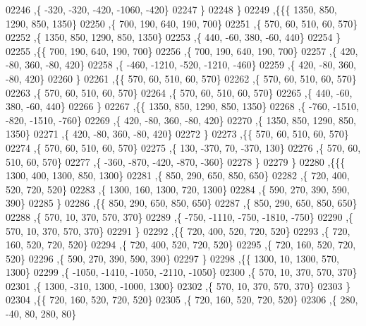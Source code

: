 \begin{DoxyCode}
02246     ,\{  -320,  -320,  -420, -1060,  -420\}
02247     \}
02248    \}
02249   ,\{\{\{  1350,   850,  1290,   850,  1350\}
02250     ,\{   700,   190,   640,   190,   700\}
02251     ,\{   570,    60,   510,    60,   570\}
02252     ,\{  1350,   850,  1290,   850,  1350\}
02253     ,\{   440,   -60,   380,   -60,   440\}
02254     \}
02255    ,\{\{   700,   190,   640,   190,   700\}
02256     ,\{   700,   190,   640,   190,   700\}
02257     ,\{   420,   -80,   360,   -80,   420\}
02258     ,\{  -460, -1210,  -520, -1210,  -460\}
02259     ,\{   420,   -80,   360,   -80,   420\}
02260     \}
02261    ,\{\{   570,    60,   510,    60,   570\}
02262     ,\{   570,    60,   510,    60,   570\}
02263     ,\{   570,    60,   510,    60,   570\}
02264     ,\{   570,    60,   510,    60,   570\}
02265     ,\{   440,   -60,   380,   -60,   440\}
02266     \}
02267    ,\{\{  1350,   850,  1290,   850,  1350\}
02268     ,\{  -760, -1510,  -820, -1510,  -760\}
02269     ,\{   420,   -80,   360,   -80,   420\}
02270     ,\{  1350,   850,  1290,   850,  1350\}
02271     ,\{   420,   -80,   360,   -80,   420\}
02272     \}
02273    ,\{\{   570,    60,   510,    60,   570\}
02274     ,\{   570,    60,   510,    60,   570\}
02275     ,\{   130,  -370,    70,  -370,   130\}
02276     ,\{   570,    60,   510,    60,   570\}
02277     ,\{  -360,  -870,  -420,  -870,  -360\}
02278     \}
02279    \}
02280   ,\{\{\{  1300,   400,  1300,   850,  1300\}
02281     ,\{   850,   290,   650,   850,   650\}
02282     ,\{   720,   400,   520,   720,   520\}
02283     ,\{  1300,   160,  1300,   720,  1300\}
02284     ,\{   590,   270,   390,   590,   390\}
02285     \}
02286    ,\{\{   850,   290,   650,   850,   650\}
02287     ,\{   850,   290,   650,   850,   650\}
02288     ,\{   570,    10,   370,   570,   370\}
02289     ,\{  -750, -1110,  -750, -1810,  -750\}
02290     ,\{   570,    10,   370,   570,   370\}
02291     \}
02292    ,\{\{   720,   400,   520,   720,   520\}
02293     ,\{   720,   160,   520,   720,   520\}
02294     ,\{   720,   400,   520,   720,   520\}
02295     ,\{   720,   160,   520,   720,   520\}
02296     ,\{   590,   270,   390,   590,   390\}
02297     \}
02298    ,\{\{  1300,    10,  1300,   570,  1300\}
02299     ,\{ -1050, -1410, -1050, -2110, -1050\}
02300     ,\{   570,    10,   370,   570,   370\}
02301     ,\{  1300,  -310,  1300, -1000,  1300\}
02302     ,\{   570,    10,   370,   570,   370\}
02303     \}
02304    ,\{\{   720,   160,   520,   720,   520\}
02305     ,\{   720,   160,   520,   720,   520\}
02306     ,\{   280,   -40,    80,   280,    80\}

\end{DoxyCode}
